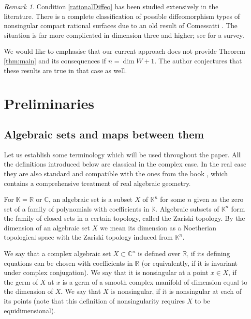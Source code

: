 \documentclass{amsart}
\theoremstyle{plain}
\theoremstyle{definition}
\theoremstyle{remark}
\newtheorem{rem}{Remark}[thm]
\numberwithin{equation}{thm} %
\newcommand{\R}{\mathbb{R}}
\newcommand{\C}{\mathbb{C}}
\newcommand{\K}{\mathbb{K}}
\begin{document}
\begin{rem}
Condition \eqref{rationalDiffeo} has been studied extensively in the literature. There is a complete classification of possible diffeomorphism types of nonsingular compact rational surfaces due to an old result of Comessatti \cite{comessattiSullaConnessioneSuperficie1914}. The situation is far more complicated in dimension three and higher; see \cite[Chapter 6]{mangolteRealAlgebraicVarieties2020} for a survey.
\end{rem}

We would like to emphasise that our current approach does not provide Theorem \ref{thm:main} and its consequences if $n=\dim W+1$. The author conjectures that these results are true in that case as well.

\section{Preliminaries}\label{sec:pre}
\subsection{Algebraic sets and maps between them}
Let us establish some terminology which will be used throughout the paper. All the definitions introduced below are classical in the complex case. In the real case they are also standard and compatible with the ones from the book \cite{bochnakRealAlgebraicGeometry1998}, which contains a comprehensive treatment of real algebraic geometry.

For $\K=\R$ or $\C$, an algebraic set is a subset $X$ of $\K^n$ for some $n$ given as the zero set of a family of polynomials with coefficients in $\K$. Algebraic subsets of $\K^n$ form the family of closed sets in a certain topology, called the Zariski topology. By the dimension of an algebraic set $X$ we mean its dimension as a Noetherian topological space with the Zariski topology induced from $\K^n$. 

We say that a complex algebraic set $X\subset \C^n$ is defined over $\R$, if its defining equations can be chosen with coefficients in $\R$ (or equivalently, if it is invariant under complex conjugation). We say that it is nonsingular at a point $x\in X$, if the germ of $X$ at $x$ is a germ of a smooth complex manifold of dimension equal to the dimension of $X$. We say that $X$ is nonsingular, if it is nonsingular at each of its points (note that this definition of nonsingularity requires $X$ to be equidimensional).
\end{document}
